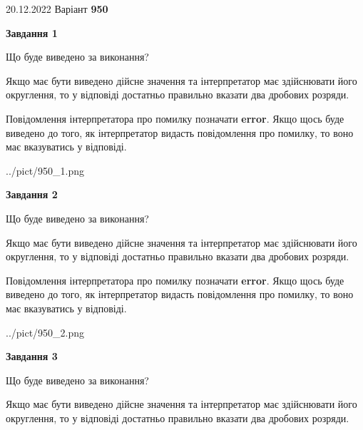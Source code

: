 \documentclass[12pt, ukrainian]{article}
\begin{document}
{20.12.2022 Варіант \No \textbf { 950 }\par}
{
\begin {Large}

{\begin {center}\textbf{Завдання 1}\end {center}}\par
Що буде виведено за виконання? \par

Якщо має бути виведено дійсне значення та інтерпретатор має здійснювати його округлення, 
то у відповіді достатньо правильно вказати два дробових розряди.

Повідомлення інтерпретатора про помилку позначати \textbf{error}.
Якщо щось буде виведено до того, як інтерпретатор видасть повідомлення про помилку, 
то воно має вказуватись у відповіді. \par

\begin{center}
	{../pict/950_1.png}
\end{center}
\newpage

{\begin {center}\textbf{Завдання 2}\end {center}}\par
Що буде виведено за виконання? \par

Якщо має бути виведено дійсне значення та інтерпретатор має здійснювати його округлення, 
то у відповіді достатньо правильно вказати два дробових розряди.

Повідомлення інтерпретатора про помилку позначати \textbf{error}.
Якщо щось буде виведено до того, як інтерпретатор видасть повідомлення про помилку, 
то воно має вказуватись у відповіді. \par

\begin{center}
	{../pict/950_2.png}
\end{center}
\newpage

{\begin {center}\textbf{Завдання 3}\end {center}}\par
Що буде виведено за виконання? \par

Якщо має бути виведено дійсне значення та інтерпретатор має здійснювати його округлення, 
то у відповіді достатньо правильно вказати два дробових розряди.


\end{Large}}
\end{document}
